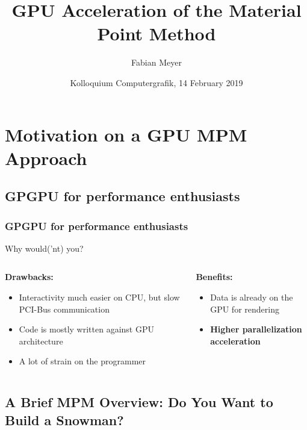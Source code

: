 \documentclass{beamer}
\title{GPU Acceleration of the Material Point Method}
\author %
{Fabian Meyer}
\institute %
{University of Koblenz}
\date{Kolloquium Computergrafik, 14 February 2019}
\begin{document}
\begin{frame}
\titlepage
\end{frame}

\section{Motivation on a GPU MPM Approach}
\subsection{GPGPU for performance enthusiasts}
\begin{frame}
\frametitle{GPGPU for performance enthusiasts}
  Why would('nt) you?
  \vfill
  \begin{columns}[T]
    \begin{column}{0.45\textwidth}
      \textbf{Drawbacks:}
    \begin{itemize}
      \item Interactivity much easier on CPU, but slow PCI-Bus communication
      \item Code is mostly written against GPU architecture
      \item A lot of strain on the programmer
    \end{itemize}
    \end{column}
    \begin{column}{0.45\textwidth}
      \textbf{Benefits:}
    \begin{itemize}
      \item Data is already on the GPU for rendering
      \item \textbf{Higher parallelization acceleration}
    \end{itemize}
    \end{column}
  \end{columns}
\end{frame}

\subsection{A Brief MPM Overview: Do You Want to Build a Snowman?}
\end{document}
